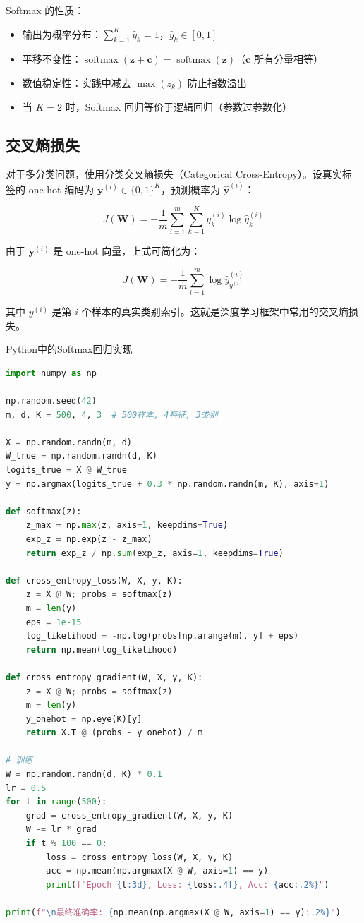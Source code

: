Softmax 的性质：
\begin{itemize}
    \item 输出为概率分布：$\sum_{k=1}^{K} \hat{y}_k = 1$，$\hat{y}_k\in[0,1]$
    \item 平移不变性：$\operatorname{softmax}(\mathbf{z}+\mathbf{c}) = \operatorname{softmax}(\mathbf{z})$（$\mathbf{c}$ 所有分量相等）
    \item 数值稳定性：实践中减去 $\max(z_k)$ 防止指数溢出
    \item 当 $K=2$ 时，Softmax 回归等价于逻辑回归（参数过参数化）
\end{itemize}

\subsection{交叉熵损失}

对于多分类问题，使用分类交叉熵损失（Categorical Cross-Entropy）。设真实标签的 one-hot 编码为 $\mathbf{y}^{(i)}\in\{0,1\}^K$，预测概率为 $\hat{\mathbf{y}}^{(i)}$：

\[
J(\mathbf{W}) = -\frac{1}{m}\sum_{i=1}^{m}\sum_{k=1}^{K} y_k^{(i)} \log \hat{y}_k^{(i)}
\]

由于 $\mathbf{y}^{(i)}$ 是 one-hot 向量，上式可简化为：

\[
J(\mathbf{W}) = -\frac{1}{m}\sum_{i=1}^{m} \log \hat{y}_{y^{(i)}}^{(i)}
\]

其中 $y^{(i)}$ 是第 $i$ 个样本的真实类别索引。这就是深度学习框架中常用的交叉熵损失。

\begin{mycode}{Python中的Softmax回归实现}
\begin{lstlisting}[language=Python]
import numpy as np

np.random.seed(42)
m, d, K = 500, 4, 3  # 500样本, 4特征, 3类别

X = np.random.randn(m, d)
W_true = np.random.randn(d, K)
logits_true = X @ W_true
y = np.argmax(logits_true + 0.3 * np.random.randn(m, K), axis=1)

def softmax(z):
    z_max = np.max(z, axis=1, keepdims=True)
    exp_z = np.exp(z - z_max)
    return exp_z / np.sum(exp_z, axis=1, keepdims=True)

def cross_entropy_loss(W, X, y, K):
    z = X @ W; probs = softmax(z)
    m = len(y)
    eps = 1e-15
    log_likelihood = -np.log(probs[np.arange(m), y] + eps)
    return np.mean(log_likelihood)

def cross_entropy_gradient(W, X, y, K):
    z = X @ W; probs = softmax(z)
    m = len(y)
    y_onehot = np.eye(K)[y]
    return X.T @ (probs - y_onehot) / m

# 训练
W = np.random.randn(d, K) * 0.1
lr = 0.5
for t in range(500):
    grad = cross_entropy_gradient(W, X, y, K)
    W -= lr * grad
    if t % 100 == 0:
        loss = cross_entropy_loss(W, X, y, K)
        acc = np.mean(np.argmax(X @ W, axis=1) == y)
        print(f"Epoch {t:3d}, Loss: {loss:.4f}, Acc: {acc:.2%}")

print(f"\n最终准确率: {np.mean(np.argmax(X @ W, axis=1) == y):.2%}")
\end{lstlisting}
\end{mycode}

